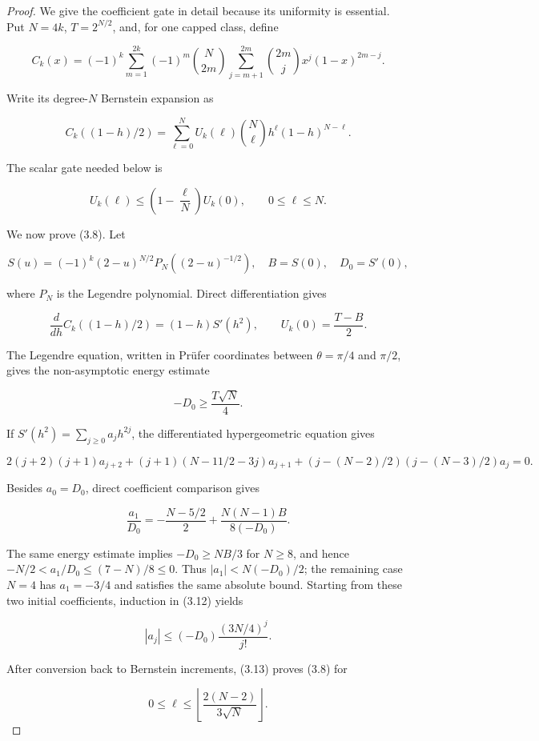 \documentclass[11pt]{article}
\begin{document}
\begin{proof}


We give the coefficient gate in detail because its uniformity is essential.  Put
$N=4k$, $T=2^{N/2}$, and, for one capped class, define

\[
C_k(x)=(-1)^k\sum_{m=1}^{2k}(-1)^m\binom N{2m}
 \sum_{j=m+1}^{2m}\binom{2m}{j}x^j(1-x)^{2m-j}. \tag{3.6}
\]

Write its degree-$N$ Bernstein expansion as

\[
C_k((1-h)/2)=\sum_{\ell=0}^{N}U_k(\ell)\binom N\ell
h^\ell(1-h)^{N-\ell}. \tag{3.7}
\]

The scalar gate needed below is

\[
U_k(\ell)\le\left(1-\frac\ell N\right)U_k(0),
\qquad 0\le\ell\le N. \tag{3.8}
\]

We now prove (3.8).  Let

\[
S(u)=(-1)^k(2-u)^{N/2}P_N((2-u)^{-1/2}),\quad
B=S(0),\quad D_0=S'(0), \tag{3.9}
\]

where $P_N$ is the Legendre polynomial.  Direct differentiation gives

\[
 \frac d{dh}C_k((1-h)/2)=(1-h)S'(h^2),\qquad
 U_k(0)=\frac{T-B}{2}. \tag{3.10}
\]

The Legendre equation, written in Prüfer coordinates between
$\theta=\pi/4$ and $\pi/2$, gives the non-asymptotic energy estimate

\[
-D_0\ge\frac{T\sqrt N}{4}. \tag{3.11}
\]

If $S'(h^2)=\sum_{j\ge0}a_jh^{2j}$, the differentiated
hypergeometric equation gives

\[
2(j+2)(j+1)a_{j+2}+(j+1)(N-11/2-3j)a_{j+1}
+(j-(N-2)/2)(j-(N-3)/2)a_j=0. \tag{3.12}
\]

Besides $a_0=D_0$, direct coefficient comparison gives

\[
\frac{a_1}{D_0}
=-\frac{N-5/2}{2}+\frac{N(N-1)B}{8(-D_0)}.
\]

The same energy estimate implies $-D_0\ge NB/3$ for $N\ge8$, and hence
$-N/2<a_1/D_0\le(7-N)/8\le0$.  Thus
$|a_1|<N(-D_0)/2$; the remaining case $N=4$ has
$a_1=-3/4$ and satisfies the same absolute bound.  Starting from these two
initial coefficients, induction in (3.12) yields

\[
|a_j|\le(-D_0)\frac{(3N/4)^j}{j!}. \tag{3.13}
\]

After conversion back to Bernstein increments, (3.13) proves (3.8) for

\[
0\le\ell\le\left\lfloor\frac{2(N-2)}{3\sqrt N}\right\rfloor. \tag{3.14}
\]


\end{proof}
\end{document}

